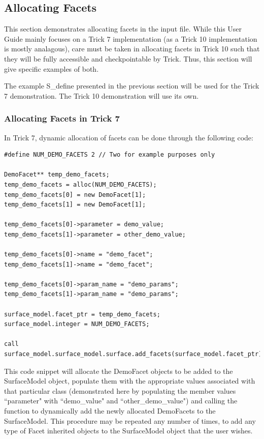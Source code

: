 \subsection{Allocating Facets}

This section demonstrates allocating
facets in the input file. While this User Guide mainly focuses on a Trick 7
implementation (as a Trick 10 implementation is mostly analagous),
care must be taken in allocating facets in Trick 10 such that they will
be fully accessible and checkpointable by Trick. Thus, this section
will give specific examples of both.

The example S\_define presented in the previous section will
be used for the Trick 7 demonstration. The Trick 10 demonstration will
use its own.

\subsubsection{Allocating Facets in Trick 7}

In Trick 7, dynamic allocation of facets can be done
through the following code:

\begin{verbatim}
#define NUM_DEMO_FACETS 2 // Two for example purposes only

DemoFacet** temp_demo_facets;
temp_demo_facets = alloc(NUM_DEMO_FACETS);
temp_demo_facets[0] = new DemoFacet[1];
temp_demo_facets[1] = new DemoFacet[1];

temp_demo_facets[0]->parameter = demo_value;
temp_demo_facets[1]->parameter = other_demo_value;

temp_demo_facets[0]->name = "demo_facet";
temp_demo_facets[1]->name = "demo_facet";

temp_demo_facets[0]->param_name = "demo_params";
temp_demo_facets[1]->param_name = "demo_params";

surface_model.facet_ptr = temp_demo_facets;
surface_model.integer = NUM_DEMO_FACETS;

call surface_model.surface_model.surface.add_facets(surface_model.facet_ptr);
\end{verbatim}

This code snippet will allocate the DemoFacet objects to be added to
the SurfaceModel object, populate them with the appropriate values
associated with that particular class (demonstrated here by populating
the member values ``parameter" with ``demo\_value" and ``other\_demo\_value")
and calling the function to dynamically add the newly allocated DemoFacets
to the SurfaceModel. This procedure may be repeated any number of times,
to add any type of Facet inherited objects to the SurfaceModel object
that the user wishes.

